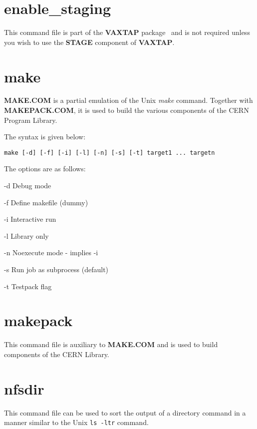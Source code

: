 \section{enable\_staging}

This command file is part of the {\bf VAXTAP} package~\cite{bib-VAXTAP}
and is not required unless you wish to use the {\bf STAGE} component
of {\bf VAXTAP}.

\section{make}

{\bf MAKE.COM} is a partial emulation of the Unix {\it make} command.
Together with {\bf MAKEPACK.COM}, it is used to build the various
components of the CERN Program Library.

The syntax is given below:

\begin{verbatim}
make [-d] [-f] [-i] [-l] [-n] [-s] [-t] target1 ... targetn
\end{verbatim}
The options are as follows:
\begin{DLtt}{12}
\item[-d]Debug mode
\item[-f]Define makefile (dummy)
\item[-i]Interactive run
\item[-l]Library only
\item[-n]Noexecute mode - implies -i
\item[-s]Run job as subprocess (default)
\item[-t]Testpack flag
\end{DLtt}

\section{makepack}

This command file is auxiliary to {\bf MAKE.COM} and is used
to build components of the CERN Library. 

\section{nfsdir}

This command file can be used to sort the output of a directory
command in a manner similar to the Unix {\tt ls -ltr} command.

